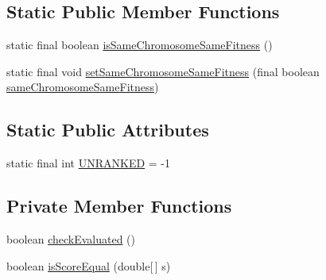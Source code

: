 \subsection*{Static Public Member Functions}
\begin{DoxyCompactItemize}
\item 
static final boolean \hyperlink{classjenes_1_1population_1_1_individual_3_01_t_01extends_01_chromosome_01_4_adc6718949b2a065a657f0ac5e7aef664}{is\-Same\-Chromosome\-Same\-Fitness} ()
\item 
static final void \hyperlink{classjenes_1_1population_1_1_individual_3_01_t_01extends_01_chromosome_01_4_a1552d231f0bf2ebdba499e4575d2fa95}{set\-Same\-Chromosome\-Same\-Fitness} (final boolean \hyperlink{classjenes_1_1population_1_1_individual_3_01_t_01extends_01_chromosome_01_4_a76c4bb153b0ed0eb30b9cf1faa376c20}{same\-Chromosome\-Same\-Fitness})
\end{DoxyCompactItemize}
\subsection*{Static Public Attributes}
\begin{DoxyCompactItemize}
\item 
static final int \hyperlink{classjenes_1_1population_1_1_individual_3_01_t_01extends_01_chromosome_01_4_a6f913202241aa5f7255e482179175f62}{U\-N\-R\-A\-N\-K\-E\-D} = -\/1
\end{DoxyCompactItemize}
\subsection*{Private Member Functions}
\begin{DoxyCompactItemize}
\item 
boolean \hyperlink{classjenes_1_1population_1_1_individual_3_01_t_01extends_01_chromosome_01_4_acfba33ed514b9d558e8f99b72479039a}{check\-Evaluated} ()
\item 
boolean \hyperlink{classjenes_1_1population_1_1_individual_3_01_t_01extends_01_chromosome_01_4_a9ef06ba449749c02b5da67194e09a696}{is\-Score\-Equal} (double\mbox{[}$\,$\mbox{]} s)
\end{DoxyCompactItemize}
